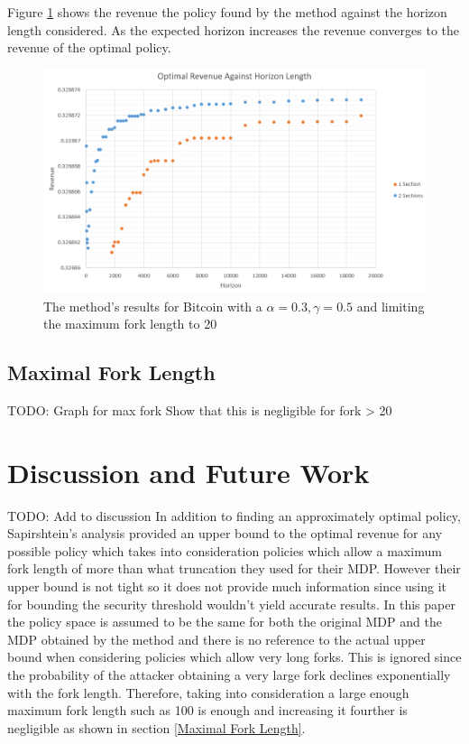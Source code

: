 \documentclass{article}
\begin{document}
Figure \ref{fig:empirical_results} shows the revenue the policy found by the method against the horizon length considered. As the expected horizon increases the revenue converges to the revenue of the optimal policy.
\begin{figure}[H]
    \centering
    \includegraphics[width=\textwidth]{graph1.png}
    \caption{The method's results for Bitcoin with a $\alpha = 0.3, \gamma = 0.5$ and limiting the maximum fork length to 20}
    \label{fig:empirical_results}
\end{figure}

\subsection{Maximal Fork Length}
TODO: Graph for max fork
Show that this is negligible for fork > 20

\section{Discussion and Future Work}
TODO: Add to discussion
In addition to finding an approximately optimal policy, Sapirshtein's analysis provided an upper bound to the optimal revenue for any possible policy which takes into consideration policies which allow a maximum fork length of more than what truncation they used for their MDP. However their upper bound is not tight so it does not provide much information since using it for bounding the security threshold wouldn't yield accurate results.
In this paper the policy space is assumed to be the same for both the original MDP and the MDP obtained by the method and there is no reference to the actual upper bound when considering policies which allow very long forks. This is ignored since the probability of the attacker obtaining a very large fork declines exponentially with the fork length. Therefore, taking into consideration a large enough maximum fork length such as 100 is enough and increasing it fourther is negligible as shown in section \ref{Maximal Fork Length}.
\end{document}
